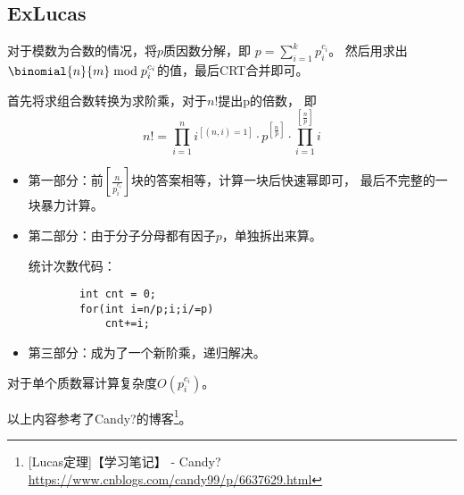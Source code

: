 \subsection{ExLucas}
对于模数为合数的情况，将$p$质因数分解，即
$\displaystyle p=\sum_{i=1}^k{p_i^{c_i}}$。
然后用求出$\binomial{n}{m} \bmod{p_i^{c_i}}$的值，最后CRT合并即可。

首先将求组合数转换为求阶乘，对于$n!$提出p的倍数，
即\begin{displaymath}
	n!=\prod_{i=1}^n{i^{[(n,i)=1]}}\cdot p^{[\frac{n}{p}]}\cdot
	\prod_{i=1}^{[\frac{n}{p}]}i
\end{displaymath}
\begin{itemize}
	\item 第一部分：前$[\frac{n}{p_i^{c_i}}]$块的答案相等，计算一块后快速幂即可，
	      最后不完整的一块暴力计算。
	\item 第二部分：由于分子分母都有因子$p$，单独拆出来算。

	统计次数代码：
	\begin{lstlisting}
		int cnt = 0;
		for(int i=n/p;i;i/=p)
			cnt+=i;
	\end{lstlisting}
	\item 第三部分：成为了一个新阶乘，递归解决。
\end{itemize}
对于单个质数幂计算复杂度$O(p_i^{c_i})$。

以上内容参考了Candy?的博客\footnote{[Lucas定理]【学习笔记】 - Candy?
	\url{https://www.cnblogs.com/candy99/p/6637629.html}}。

